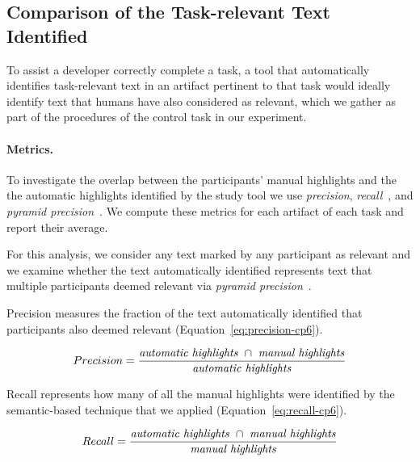 
\subsection{Comparison of the Task-relevant Text Identified}
\label{cp6:comparison}


To assist a developer correctly complete a task, a tool that
automatically identifies task-relevant text in an artifact pertinent to that task would ideally 
identify text that humans have also considered as relevant, which we gather as part of the procedures 
of the control task in our experiment. 



\paragraph{\textbf{Metrics.}}

To investigate the overlap between the participants' manual highlights and the 
the automatic highlights identified by the study tool we use \textit{precision}, \textit{recall}~\cite{manning2010IR}, and \textit{pyramid precision}~\cite{Nenkova2004}.
We compute these metrics for each artifact of each task and report their average.


For this analysis, we consider any text marked by any participant as relevant
and we examine whether 
the text automatically identified represents text that multiple participants deemed relevant
 via \textit{pyramid precision}~\cite{Lotufo2012}.


Precision measures the fraction of the text automatically identified  that participants also deemed relevant (Equation~\ref{eq:precision-cp6}). 

\smallskip
\begin{small}
\begin{equation}
    Precision = \frac{
        \text{\textit{automatic highlights}~} \cap 
        \text{~\textit{manual highlights}}
    }{\text{\textit{automatic highlights}}}
\label{eq:precision-cp6}    
\end{equation}
\end{small}


Recall represents how many of all the manual highlights were identified by the semantic-based technique that we applied (Equation~\ref{eq:recall-cp6}). 



\smallskip
\begin{small}
\begin{equation}
    Recall = \frac{
        \text{\textit{automatic highlights}~} \cap 
        \text{~\textit{manual highlights}}
    }{\text{\textit{manual highlights}}}
\label{eq:recall-cp6}    
\end{equation}
\end{small}

